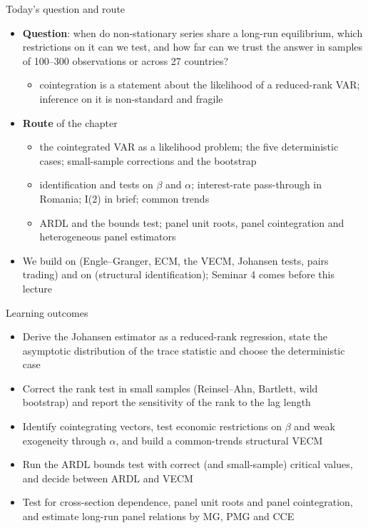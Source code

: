 \begin{frame}{Today's question and route}
\itemsize{\small}
\begin{itemize}
    \item \textbf{Question}: when do non-stationary series share a long-run equilibrium, which restrictions on it can we test, and how far can we trust the answer in samples of 100--300 observations or across 27 countries?
    \begin{itemize}
        \item cointegration is a statement about the likelihood of a reduced-rank VAR; inference on it is non-standard and fragile
    \end{itemize}
    \item \textbf{Route} of the chapter
    \begin{itemize}
        \item the cointegrated VAR as a likelihood problem; the five deterministic cases; small-sample corrections and the bootstrap
        \item identification and tests on $\beta$ and $\alpha$; interest-rate pass-through in Romania; I(2) in brief; common trends
        \item ARDL and the bounds test; panel unit roots, panel cointegration and heterogeneous panel estimators
    \end{itemize}
    \item We build on  (Engle--Granger, ECM, the VECM, Johansen tests, pairs trading) and on  (structural identification); Seminar 4 comes before this lecture
\end{itemize}
\end{frame}

\begin{frame}{Learning outcomes}
\itemsize{\small}
\begin{itemize}
    \item Derive the Johansen estimator as a reduced-rank regression, state the asymptotic distribution of the trace statistic and choose the deterministic case
    \item Correct the rank test in small samples (Reinsel--Ahn, Bartlett, wild bootstrap) and report the sensitivity of the rank to the lag length
    \item Identify cointegrating vectors, test economic restrictions on $\beta$ and weak exogeneity through $\alpha$, and build a common-trends structural VECM
    \item Run the ARDL bounds test with correct (and small-sample) critical values, and decide between ARDL and VECM
    \item Test for cross-section dependence, panel unit roots and panel cointegration, and estimate long-run panel relations by MG, PMG and CCE
\end{itemize}
\end{frame}

